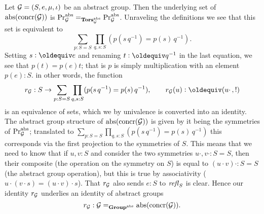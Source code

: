 \begin{example}
  \label{ex:abstrconcrG}
  Let ${\mathcal G}=(S,e,\mu,\iota)$ be an abstract group.  
Then the underlying set of $\mathrm{abs}(\mathrm{concr}({\mathcal G}))$ is $\mathrm{Pr}_{{\mathcal G}}^{\mathrm{abs}}=_{\mathbf{Tors}^{\mathrm{abs}}_{\mathcal G}}\mathrm{Pr}_{{\mathcal G}}^{\mathrm{abs}}$.  
Unraveling the definitions we see that this set is equivalent to
$$\sum_{p:S=S}\prod_{q,s:S}(p(s\,q^{-1})=p(s)\,q^{-1}).
$$  
Setting $s\defequi e$ and renaming $t\defequi q^{-1}$ in the last equation, we see that $p(t)=p(e)t$; that is $p$ is simply multiplication with an element $p(e):S$.  in other words, the function 
$$r_{\agp G}:S\to  \sum_{p:S=S}\prod_{q,s:S}(p(s\,q^{-1})=p(s)\,q^{-1}),\qquad r_{\agp G}(u)\defequi(u\cdot\,,!)
$$  
is an equivalence of sets, which we by univalence is converted into an identity.  
The abstract group structure of $\mathrm{abs}(\mathrm{concr}({\mathcal G}))$ is given by it being the symmetries of $\mathrm{Pr}_{{\mathcal G}}^{\mathrm{abs}}$; translated to $\sum_{p:S=S}\prod_{q,s:S}(p(s\,q^{-1})=p(s)\,q^{-1})$ this corresponds via the first projection to the symmetries of $S$. %
This means that we need to know that if $u,v:S$ and consider the two symmetries $u\cdot,v\cdot:S=S$, then their composite (the operation on the symmetry on $S$) is equal to $(u\cdot v)\cdot:S=S$ (the abstract group operation), but this is true by associativity ($u\cdot(v\cdot s)=(u\cdot v)\cdot s$).  That $r_{\mathcal G}$ also sends $e:S$ to $\mathop{\mathit{refl}_{S}}$ is clear.
Hence our identity $r_{\mathcal G}$ underlies an identity of abstract groups
$$r_{\mathcal G}:{\mathcal G}=_{\mathbf{Group}^{\mathrm{abs}}}\mathrm{abs}(\mathrm{concr}({\mathcal G})).$$
\end{example}

